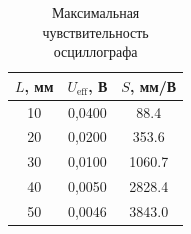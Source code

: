 \begin{table}[h]
\centering
\caption{Максимальная чувствительность осциллографа}
\label{tab:maxS}
\begin{tabular}{|c|c|c|}
\hline
$L$, мм & $U_{\text{eff}}$, В & $S$, мм/В \\
\hline
10 & 0,0400 & 88.4 \\
20 & 0,0200 & 353.6 \\
30 & 0,0100 & 1060.7 \\
40 & 0,0050 & 2828.4 \\
50 & 0,0046 & 3843.0 \\
\hline
\end{tabular}
\end{table}

